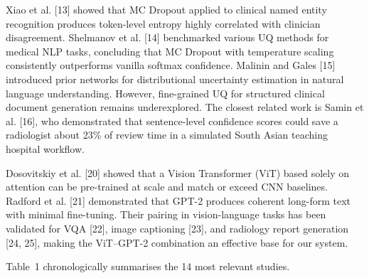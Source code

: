 \documentclass{jcst}
\begin{document}
Xiao et al. [13] showed that MC Dropout applied to clinical named entity recognition produces token-level entropy highly correlated with clinician disagreement. Shelmanov et al. [14] benchmarked various UQ methods for medical NLP tasks, concluding that MC Dropout with temperature scaling consistently outperforms vanilla softmax confidence. Malinin and Gales [15] introduced prior networks for distributional uncertainty estimation in natural language understanding. However, fine-grained UQ for structured clinical document generation remains underexplored. The closest related work is Samin et al. [16], who demonstrated that sentence-level confidence scores could save a radiologist about 23\% of review time in a simulated South Asian teaching hospital workflow.

Dosovitskiy et al. [20] showed that a Vision Transformer (ViT) based solely on attention can be pre-trained at scale and match or exceed CNN baselines. Radford et al. [21] demonstrated that GPT-2 produces coherent long-form text with minimal fine-tuning. Their pairing in vision-language tasks has been validated for VQA [22], image captioning [23], and radiology report generation [24, 25], making the ViT–GPT-2 combination an effective base for our system.

Table~1 chronologically summarises the 14 most relevant studies.
\end{document}
